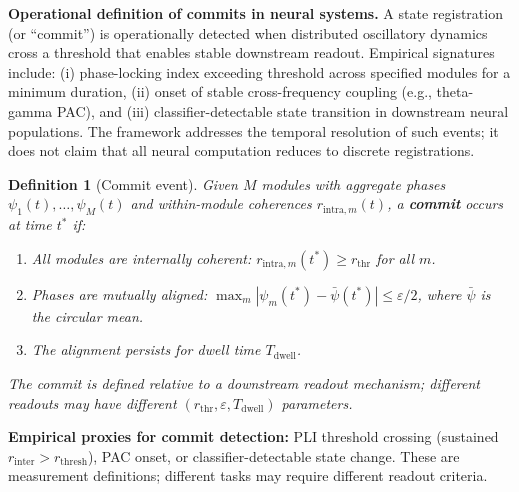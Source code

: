 \documentclass[12pt]{article}
\newtheorem{definition}{Definition}
\begin{document}
\textbf{Operational definition of commits in neural systems.} A state registration (or ``commit'') is operationally detected when distributed oscillatory dynamics cross a threshold that enables stable downstream readout. Empirical signatures include: (i) phase-locking index exceeding threshold across specified modules for a minimum duration, (ii) onset of stable cross-frequency coupling (e.g., theta-gamma PAC), and (iii) classifier-detectable state transition in downstream neural populations. The framework addresses the temporal resolution of such events; it does not claim that all neural computation reduces to discrete registrations.

\begin{definition}[Commit event]\label{def:commit}
Given $M$ modules with aggregate phases $\psi_1(t), \ldots, \psi_M(t)$ and within-module coherences $r_{\mathrm{intra},m}(t)$, a \textbf{commit} occurs at time $t^*$ if:
\begin{enumerate}
\item All modules are internally coherent: $r_{\mathrm{intra},m}(t^*) \geq r_{\mathrm{thr}}$ for all $m$.
\item Phases are mutually aligned: $\max_m |\psi_m(t^*) - \bar{\psi}(t^*)| \leq \varepsilon/2$, where $\bar{\psi}$ is the circular mean.
\item The alignment persists for dwell time $T_{\mathrm{dwell}}$.
\end{enumerate}
The commit is defined \emph{relative to a downstream readout mechanism}; different readouts may have different $(r_{\mathrm{thr}}, \varepsilon, T_{\mathrm{dwell}})$ parameters.
\end{definition}

\textbf{Empirical proxies for commit detection:} PLI threshold crossing (sustained $r_{\mathrm{inter}} > r_{\mathrm{thresh}}$), PAC onset, or classifier-detectable state change. These are measurement definitions; different tasks may require different readout criteria.

\medskip

\noindent{}
\end{document}
